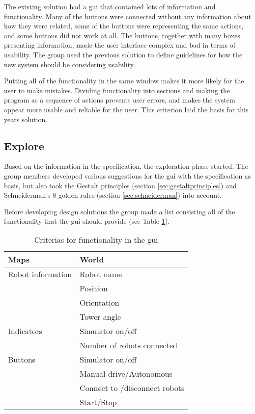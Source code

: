 The existing solution had a \acrshort{gui} that contained lots of information and functionality. Many of the buttons were connected without any information about how they were related, some of the buttons were representing the same actions, and some buttons did not work at all. The buttons, together with many boxes presenting information, made the user interface complex and bad in terms of usability. The group used the previous solution to define guidelines for how the new system should be considering usability.

Putting all of the functionality in the same window makes it more likely for the user to make mistakes. Dividing functionality into sections and making the program as a sequence of actions prevents user errors, and makes the system appear more usable and reliable for the user. This criterion laid the basis for this years solution. 

\subsection{Explore}
\label{sec:explore}
Based on the information in the specification, the exploration phase started. The group members developed various suggestions for the \acrshort{gui} with the specification as basis, but also took the Gestalt principles (section \ref{sec:gestaltprinciples}) and Schneiderman's 8 golden rules (section \ref{sec:schneiderman}) into account.

Before developing design solutions the group made a list consisting all of the functionality that the \acrshort{gui} should provide (see Table \ref{tab:guicriterias}).
\begin{table}[ht]
\begin{center}
 \begin{tabular}{|l l|} 
 \hline
 Maps               &   World \\
 \hline
 Robot information  &   Robot name \\
                    &   Position \\
                    &   Orientation \\
                    &   Tower angle \\
 \hline
 Indicators         &   Simulator on/off \\
                    &   Number of robots connected \\
 \hline
 Buttons            &   Simulator on/off \\
                    &   Manual drive/Autonomous \\
                    &   Connect to /disconnect robots \\
                    &   Start/Stop \\

\hline
\end{tabular}
\end{center}
\caption{Criterias for functionality in the \acrshort{gui}}
\label{tab:guicriterias}
\end{table}


